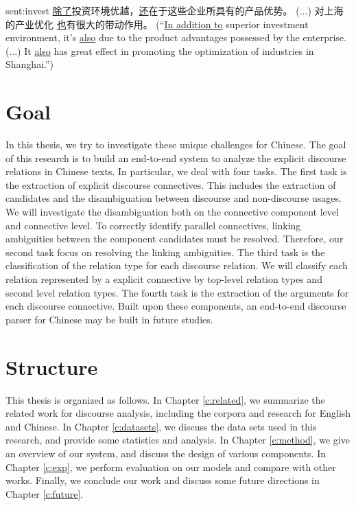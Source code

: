 \begin{sent}{sent:invest}{}
\underline{除了}投资环境优越，\underline{还}在于这些企业所具有的产品优势。
(...) 对上海的产业优化 \underline{也}有很大的带动作用。
(``\underline{In addition to} 
superior investment environment, it's \underline{also} due to the product
advantages possessed by the enterprise. (...) It \underline{also} has 
great effect in promoting the optimization of industries in Shanghai.'')
\end{sent}



%
%
\section{Goal}

In this thesis, we try to investigate these unique challenges for Chinese.
The goal of this research is to build an end-to-end system to analyze
the explicit discourse relations in Chinese texts. In particular, we
deal with four tasks. The first task is the extraction of explicit discourse
connectives. This includes the extraction of candidates and the disambiguation
between discourse and non-discourse usages. We will investigate the disambiguation
both on the connective component level and connective level.
To correctly identify parallel connectives, linking ambiguities between
the component candidates must be resolved. Therefore, our second task
focus on resolving the linking ambiguities.
The third task is the classification of the relation type for each discourse
relation.
We will classify each relation represented by a explicit connective by top-level
relation types and second level relation types.
The fourth task is the extraction of the arguments for each discourse connective.
Built upon these components, an end-to-end discourse parser for Chinese may
be built in future studies.

%
%
\section{Structure}
This thesis is organized as follows. In Chapter \ref{c:related}, we summarize
the related work for discourse analysis, including the corpora and research for
English and Chinese. In Chapter \ref{c:datasets}, we discuss the data sets used in
this research, and provide some statistics and analysis. In Chapter \ref{c:method},
we give an overview of our system, and discuss the design of various components.
In Chapter \ref{c:exp}, we perform evaluation on our models and compare with
other works. Finally, we conclude our work and discuss some future directions in
Chapter \ref{c:future}.
